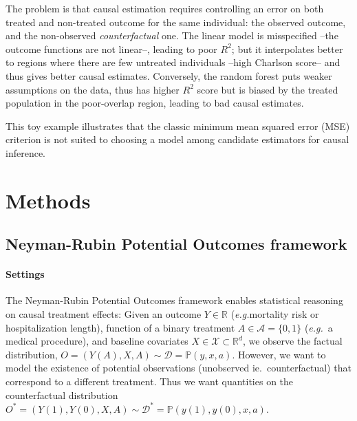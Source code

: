 \documentclass[a4paper,num-refs]{oup-contemporary}%
\newcommand{\eg}{\emph{e.g.}}
\begin{document}
The problem is that causal estimation requires controlling
an error on both treated and non-treated outcome for the same individual:
the observed outcome, and the non-observed \emph{counterfactual} one.
The linear model is misspecified --the outcome functions are not
linear--, leading to poor $R^2$; but it interpolates better to regions
where there are few untreated individuals --high Charlson score-- and
thus gives better causal estimates. Conversely, the random forest puts
weaker assumptions on the data, thus has higher $R^2$ score but is biased
by the treated population in the poor-overlap region, leading
to bad causal estimates.

This toy example illustrates that the classic minimum mean squared error (MSE)
criterion is not suited to choosing a model among candidate
estimators for causal inference.



\section{Methods}\label{sec:framework}
\subsection{Neyman-Rubin Potential Outcomes framework}%
\label{sec:neyman_rubin}%

\paragraph{Settings}

The Neyman-Rubin Potential Outcomes framework
\cite{naimi2023defining,imbens_causal_2015} enables statistical reasoning on
causal treatment effects: Given an outcome $Y \in \mathbb R$ (\eg mortality risk
or hospitalization length), function of a binary treatment $A \in \mathcal{A} =
    \{0, 1\}$ (\eg~a medical procedure), and baseline
covariates $X \in \mathcal{X} \subset \mathbb{R}^d$, we observe the factual
distribution, $O = (Y(A), X, A) \sim \mathcal D = \mathbb P(y, x, a)$. However,
we want to model the existence of potential observations (unobserved ie.~counterfactual) that correspond to a different treatment. Thus we want
quantities on the counterfactual distribution $O^{*} = (Y(1), Y(0), X, A) \sim
    \mathcal D^{*} = \mathbb P(y(1), y(0), x, a)$.
\end{document}
